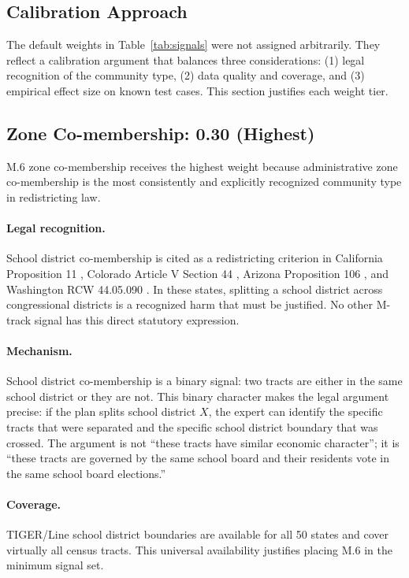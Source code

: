 \label{sec:algorithm}

\subsection{Calibration Approach}

The default weights in Table~\ref{tab:signals} were not assigned arbitrarily.
They reflect a calibration argument that balances three considerations:
(1) legal recognition of the community type, (2) data quality and coverage,
and (3) empirical effect size on known test cases.
This section justifies each weight tier.

\subsection{Zone Co-membership: 0.30 (Highest)}

M.6 zone co-membership receives the highest weight because administrative
zone co-membership is the most consistently and explicitly recognized
community type in redistricting law.

\paragraph{Legal recognition.}
School district co-membership is cited as a redistricting criterion in
California Proposition 11 \citeyearpar{caprop11}, Colorado Article V
Section 44 \citeyearpar{coart5s44}, Arizona Proposition 106
\citeyearpar{azircprop106}, and Washington RCW 44.05.090 \citeyearpar{warcw44}.
In these states, splitting a school district across congressional districts
is a recognized harm that must be justified.
No other M-track signal has this direct statutory expression.

\paragraph{Mechanism.}
School district co-membership is a binary signal: two tracts are either
in the same school district or they are not.
This binary character makes the legal argument precise: if the plan splits
school district $X$, the expert can identify the specific tracts that were
separated and the specific school district boundary that was crossed.
The argument is not ``these tracts have similar economic character''; it is
``these tracts are governed by the same school board and their residents vote
in the same school board elections.''

\paragraph{Coverage.}
TIGER/Line school district boundaries are available for all 50 states and
cover virtually all census tracts.
This universal availability justifies placing M.6 in the minimum signal set.

